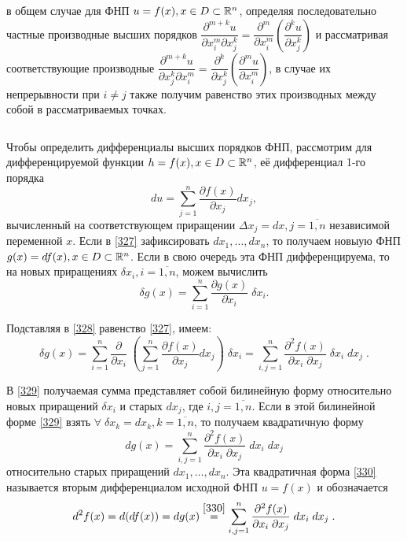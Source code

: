 \begin{note}
    в общем случае для ФНП $ u = f(x), x \in D \subset \mathbb{R}^n  $, определяя последовательно частные производные высших порядков 
    $ \dfrac{ \partial^{m+k} u }{ \partial x_i^m \partial x_j^k } = 
      \dfrac{ \partial^{m}  }{ \partial x_i^m } 
      \left( \dfrac{ \partial^{k} u }{ \partial x_j^k } \right)  $
    и рассматривая соответствующие производные 
    $ \dfrac{ \partial^{m+k} u }{ \partial x_j^k \partial x_i^m } = 
    \dfrac{ \partial^{k}  }{ \partial x_j^k } 
    \left( \dfrac{ \partial^{m} u }{ \partial x_i^m } \right)  $,
    в случае их непрерывности при $ i \neq j $ также получим равенство этих производных между собой в рассматриваемых точках.
\end{note}

$  $

Чтобы определить дифференциалы высших порядков ФНП, рассмотрим для дифференцируемой функции
$ h = f(x), x \in D \subset \mathbb{R}^n $, её дифференциал 1-го порядка 
\begin{equation}
    \label{327}
     du = \sum_{j=1}^{n} \dfrac{\partial f(x)}{\partial x_j} d x_j,
\end{equation}
вычисленный на соответствующем приращении $ \Delta x_j = dx, j = \overline{1, n} $ независимой переменной $ x $. 
Если в \eqref{327} зафиксировать $ dx_1, \ldots, dx_n $, то получаем новыую ФНП 
$ g(x) = df(x), x \in D \subset \mathbb{R}^n $.
Если в свою очередь эта ФНП дифференцируема, то на новых приращениях $ \delta x_i, i = \overline{1,n} $, можем вычислить
\begin{equation}
    \label{328}
    \delta g(x) = \sum_{i=1}^{n} \dfrac{\partial g(x)}{\partial x_i} \; \delta x_i.
\end{equation}

Подставляя в \eqref{328} равенство \eqref{327}, имеем:
\begin{equation}
\label{329}
\delta g(x) = \sum_{i=1}^{n} \dfrac{\partial}{\partial x_i} \; \left( 
       \sum_{j=1}^{n} \dfrac{\partial f(x)}{\partial x_j} d x_j
\right) \; \delta x_i
=
\sum_{i,j=1}^{n} \dfrac{\partial^2 f(x)}{\partial x_i \; \partial x_j} \; \delta x_i \; d x_j
\;.
\end{equation}

В \eqref{329} получаемая сумма представляет собой билинейную форму относительно новых приращений $ \delta x_i $ и старых $ d x_j $, где $ i,j = \overline{1, n} $.
Если в этой билинейной форме \eqref{329} взять 
$ \forall \; \delta x_k = d x_k, k = \overline{1, n} $, то получаем квадратичную форму
\begin{equation}
    \label{330}
    d g(x) =
    \sum_{i,j=1}^{n} \dfrac{\partial^2 f(x)}{\partial x_i \; \partial x_j} \; d x_i \; d x_j
\end{equation}
относительно старых приращений $ dx_1, \ldots, dx_n $. 
Эта квадратичная форма \eqref{330} называется вторым дифференциалом исходной ФНП $ u = f(x) $  и обозначается
\begin{equation*}
    d^2 f(x) = d(df(x)) = dg(x) \overset{\eqref{330}}{=}
    \sum_{i,j=1}^{n} \dfrac{\partial^2 f(x)}{\partial x_i \; \partial x_j} \; d x_i \; d x_j
    \; .
\end{equation*}

